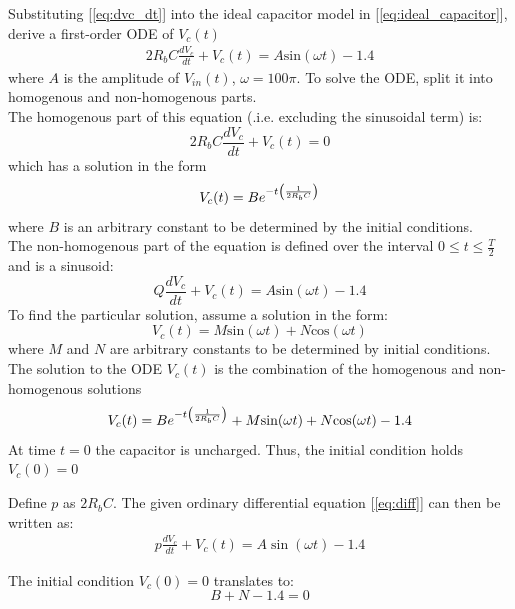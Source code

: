 Substituting [\ref{eq:dvc_dt}] into the ideal capacitor model in [\ref{eq:ideal_capacitor}], derive a first-order ODE of $V_c(t)$
\begin{align}
	2R_bC\frac{dV_c}{dt} + V_c(t) = A\text{sin}(\omega t) - 1.4
	\label{eq:diff}
\end{align}
where $A$ is the amplitude of $V_{in}(t)$, $\omega = 100\pi$. To solve the ODE, split it into homogenous and non-homogenous parts. \\

The homogenous part of this equation (.i.e. excluding the sinusoidal term) is:
\begin{equation}
	2R_bC\frac{dV_c}{dt} + V_c(t) = 0
\end{equation}
which has a solution in the form
\begin{equation}
	V_c(t) = Be^{-t\left(\frac{1}{2R_bC} \right)}
\end{equation}
where $B$ is an arbitrary constant to be determined by the initial conditions. 
\\

The non-homogenous part of the equation is defined over the interval $0 \leq t \leq \frac{T}{2}$ and is a sinusoid:
\begin{equation}
	Q\frac{dV_c}{dt} + V_c(t) = A\text{sin}(\omega t) - 1.4
\end{equation}
To find the particular solution, assume a solution in the form:
\begin{equation}
	V_c(t) = M\text{sin}(\omega t) + N\text{cos}(\omega t) 
	\label{vc_t}
\end{equation}
where $M$ and $N$ are arbitrary constants to be determined by initial conditions.\\

The solution to the ODE $V_c(t)$ is the combination of the homogenous and non-homogenous solutions
\begin{equation}
	V_c(t) = Be^{-t\left(\frac{1}{2R_bC} \right)} + M\text{sin}(\omega t) + N\text{cos}(\omega t) - 1.4
\end{equation}
At time $t=0$ the capacitor is uncharged. Thus, the initial condition holds $V_c(0) = 0$

Define $p$ as $2R_bC$. The given ordinary differential equation [\ref{eq:diff}] can then be written as:
\begin{align}
p\frac{dV_c}{dt} + V_c(t) = A\sin(\omega t) - 1.4
\end{align}

The initial condition $V_c(0) = 0$ translates to:
\begin{equation}
B + N - 1.4 = 0
\end{equation}

